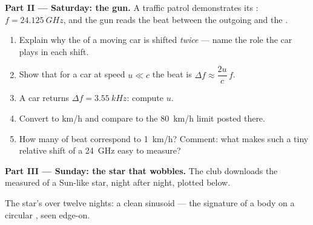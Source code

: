 \begin{problem}
\medskip
\noindent\textbf{Part II --- Saturday: the  gun.}
A traffic patrol demonstrates its : $f = \qty{24.125}{GHz}$, and the gun reads the
beat between the outgoing  and the .
\begin{enumerate}[resume]
  \item Explain why the  of a moving car is shifted \emph{twice} --- name the role the
        car plays in each shift.
  \item Show that for a car at speed $u \ll c$ the beat is $\Delta f \approx \dfrac{2u}{c}\,f$.
  \item A car returns $\Delta f = \qty{3.55}{kHz}$: compute $u$.
  \item Convert to \unit{km/h} and compare to the \qty{80}{km/h} limit posted there.
  \item How many  of beat correspond to \qty{1}{km/h}? Comment: what makes such a tiny
        relative shift of a \qty{24}{GHz}  easy to measure?
\end{enumerate}

\medskip
\noindent\textbf{Part III --- Sunday: the star that wobbles.}
The club downloads the measured  of a Sun-like star, night after night,
plotted below.

\begin{omfigure}

{\small The star's  over twelve nights: a clean sinusoid --- the
signature of a body on a circular , seen edge-on.}
\end{omfigure}


\end{problem}
